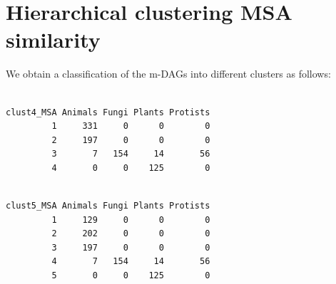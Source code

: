 \documentclass[
  letterpaper,
  DIV=11,
  numbers=noendperiod]{scrreprt}
\newenvironment{Shaded}{}{}
\newcommand{\AttributeTok}[1]{\textcolor[rgb]{0.78,0.47,0.87}{#1}}
\newcommand{\DecValTok}[1]{\textcolor[rgb]{0.82,0.60,0.40}{#1}}
\newcommand{\FunctionTok}[1]{\textcolor[rgb]{0.38,0.69,0.94}{#1}}
\newcommand{\NormalTok}[1]{\textcolor[rgb]{0.67,0.70,0.75}{#1}}
\newcommand{\OtherTok}[1]{\textcolor[rgb]{0.15,0.68,0.38}{#1}}
\newcommand{\SpecialCharTok}[1]{\textcolor[rgb]{0.34,0.71,0.76}{#1}}
\newcommand{\StringTok}[1]{\textcolor[rgb]{0.60,0.76,0.47}{#1}}
\begin{document}
\hypertarget{hierarchical-clustering-msa-similarity}{%
\section{Hierarchical clustering MSA
similarity}\label{hierarchical-clustering-msa-similarity}}

We obtain a classification of the m-DAGs into different clusters as
follows:

\begin{Shaded}
\end{Shaded}

\begin{verbatim}
          
clust4_MSA Animals Fungi Plants Protists
         1     331     0      0        0
         2     197     0      0        0
         3       7   154     14       56
         4       0     0    125        0
\end{verbatim}

\begin{Shaded}
\end{Shaded}

\begin{verbatim}
          
clust5_MSA Animals Fungi Plants Protists
         1     129     0      0        0
         2     202     0      0        0
         3     197     0      0        0
         4       7   154     14       56
         5       0     0    125        0
\end{verbatim}
\end{document}
